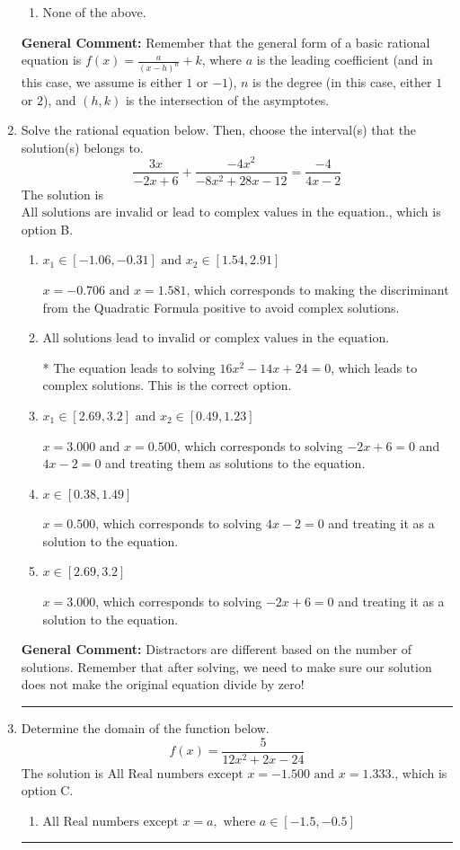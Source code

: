 \documentclass{extbook}[14pt]
\newcommand{\litem}[1]{\item #1

\rule{\textwidth}{0.4pt}}
\begin{document}
\begin{enumerate}
{\begin{enumerate}[label=\Alph*.]
\begin{multicols}{2}
\end{multicols}\item None of the above.\end{enumerate}
\textbf{General Comment:} Remember that the general form of a basic rational equation is $ f(x) = \frac{a}{(x-h)^n} + k$, where $a$ is the leading coefficient (and in this case, we assume is either $1$ or $-1$), $n$ is the degree (in this case, either $1$ or $2$), and $(h, k)$ is the intersection of the asymptotes.
}
\litem{
Solve the rational equation below. Then, choose the interval(s) that the solution(s) belongs to.
\[ \frac{3x}{-2x + 6} + \frac{-4x^{2}}{-8x^{2} +28 x -12} = \frac{-4}{4x -2} \]The solution is \( \text{All solutions are invalid or lead to complex values in the equation.} \), which is option B.\begin{enumerate}[label=\Alph*.]
\item \( x_1 \in [-1.06, -0.31] \text{ and } x_2 \in [1.54,2.91] \)

$x = -0.706 \text{ and } x = 1.581$, which corresponds to making the discriminant from the Quadratic Formula positive to avoid complex solutions.
\item \( \text{All solutions lead to invalid or complex values in the equation.} \)

* The equation leads to solving $16x^{2} -14 x + 24=0$, which leads to complex solutions. This is the correct option.
\item \( x_1 \in [2.69, 3.2] \text{ and } x_2 \in [0.49,1.23] \)

$x = 3.000 \text{ and } x = 0.500$, which corresponds to solving $-2x + 6 = 0$ and $4x -2 = 0$ and treating them as solutions to the equation.
\item \( x \in [0.38,1.49] \)

$x = 0.500$, which corresponds to solving $4x -2 = 0$ and treating it as a solution to the equation.
\item \( x \in [2.69,3.2] \)

$x = 3.000$, which corresponds to solving $-2x + 6 = 0$ and treating it as a solution to the equation.
\end{enumerate}

\textbf{General Comment:} Distractors are different based on the number of solutions. Remember that after solving, we need to make sure our solution does not make the original equation divide by zero!
}
\litem{
Determine the domain of the function below.
\[ f(x) = \frac{5}{12x^{2} +2 x -24} \]The solution is \( \text{All Real numbers except } x = -1.500 \text{ and } x = 1.333. \), which is option C.\begin{enumerate}[label=\Alph*.]
\item \( \text{All Real numbers except } x = a, \text{ where } a \in [-1.5, -0.5] \)


\end{enumerate}}
\end{enumerate}
\end{document}
